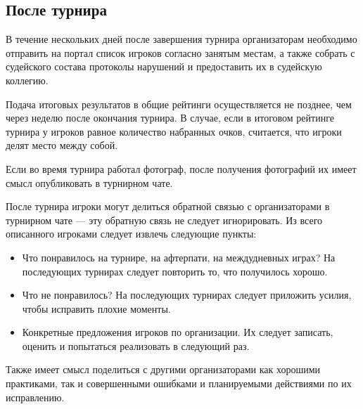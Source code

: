 \subsection{После турнира}

В течение нескольких дней после завершения турнира организаторам необходимо отправить на портал список игроков согласно занятым местам, а также собрать с судейского состава протоколы нарушений и предоставить их в судейскую коллегию.

Подача итоговых результатов в общие рейтинги осуществляется не позднее, чем через неделю после окончания турнира. В случае, если в итоговом рейтинге турнира у игроков равное количество набранных очков, считается, что игроки делят место между собой.

Если во время турнира работал фотограф, после получения фотографий их имеет смысл опубликовать в турнирном чате.

После турнира игроки могут делиться обратной связью с организаторами в турнирном чате --- эту обратную связь не следует игнорировать. Из всего описанного игроками следует извлечь следующие пункты:
\begin{itemize}
	\item Что понравилось на турнире, на афтерпати, на междудневных играх? На последующих турнирах следует повторить то, что получилось хорошо.
	\item Что не понравилось? На последующих турнирах следует приложить усилия, чтобы исправить плохие моменты.
	\item Конкретные предложения игроков по организации. Их следует записать, оценить и попытаться реализовать в следующий раз.
\end{itemize}

Также имеет смысл поделиться с другими организаторами как хорошими практиками, так и совершенными ошибками и планируемыми действиями по их исправлению. 